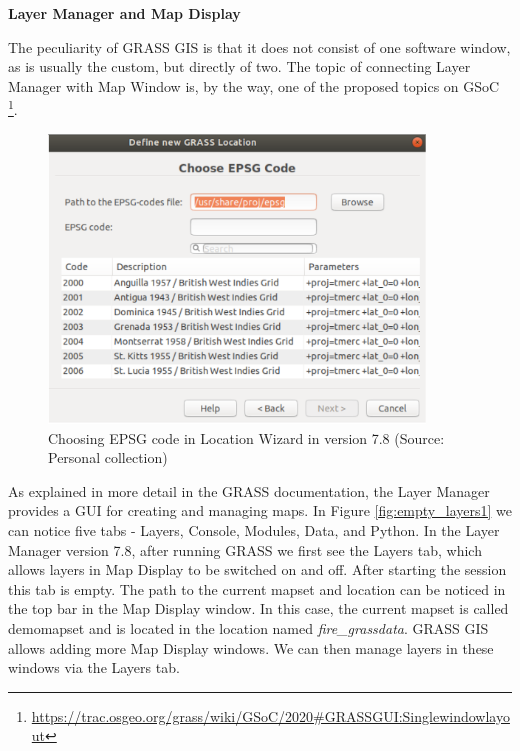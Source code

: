 \documentclass[a4paper,10pt,twoside]{article}
\begin{document}
\bigskip
\noindent \textbf {Layer Manager and Map Display}

\noindent The peculiarity of GRASS GIS is that it does not consist of one software window, as is usually the custom, but directly of two. The topic of connecting Layer Manager with Map Window is, by the way, one of the proposed topics on GSoC \footnote{\url{https://trac.osgeo.org/grass/wiki/GSoC/2020\#GRASSGUI:Singlewindowlayout}}. 

\vspace{0.3cm}
\begin{figure}[hbt!]
\begin{center}
\includegraphics[width=10cm]{../pictures/loc_wizard_sour_pred.png} 
\caption[Choosing EPSG code in Location Wizard in version 7.8]{Choosing EPSG code in Location Wizard in version 7.8 (Source: Personal collection)}
\label{fig:loc_wizard_sour_pred}
\end{center}
\end{figure}

\newpage
\noindent As explained in more detail in the GRASS documentation, the Layer Manager provides a GUI for creating and managing maps. In Figure \ref{fig:empty_layers1} we can notice five tabs - Layers, Console, Modules, Data, and Python.
In the Layer Manager version 7.8, after running GRASS we first see the Layers tab, which allows layers in Map Display to be switched on and off. After starting the session this tab is empty. The path to the current mapset and location can be noticed in the top bar in the Map Display window. In this case, the current mapset is called demomapset and is located in the location named \textit{fire\_grassdata}. GRASS GIS allows adding more Map Display windows. We can then manage layers in these windows via the Layers tab.
\end{document}
